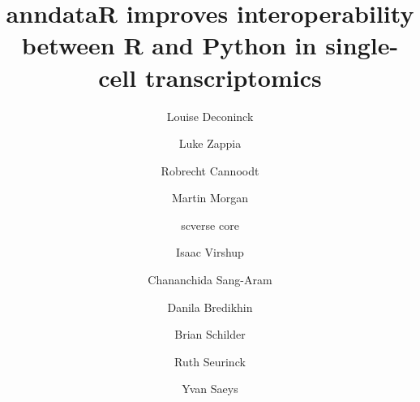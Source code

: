 \documentclass[unnumsec,webpdf,modern,large,namedate]{oup-authoring-template}%
\begin{document}



\title[]{anndataR improves interoperability between R and Python in single-cell transcriptomics}

\author[1,2,\textsuperscript{\textdagger}]{Louise Deconinck}
\author[3,\textsuperscript{\textdagger}]{Luke Zappia}
\author[1,2,3,4\textsuperscript{\textdagger}$\ast$]{Robrecht Cannoodt}
\author[5]{Martin Morgan}
\author[]{scverse core}
\author[6,7]{Isaac Virshup}
\author[1,2]{Chananchida Sang-Aram}
\author[8,9]{Danila Bredikhin}
\author[10]{Brian Schilder}
\author[1,2]{Ruth Seurinck}
\author[1,2]{Yvan Saeys}

\authormark{}

\address[1]{Data Mining and Modelling for Biomedicine, VIB Center for Inflammation Research}
\address[2]{Department of Mathematics, Computer Science and Statistics, Ghent University, Belgium}
\address[3]{Data Intuitive, Lebbeke, Belgium}
\address[4]{Edaro, Destelbergen, Belgium}
\address[5]{Department of Biostatistics and Bioinformatics, Roswell Park Comprehensive Cancer Center}
\address[6]{Institute of Computational Biology, Helmholtz, Center Munich, Munich, Germany}
\address[7]{Chan Zuckerberg Initiative, Redwood City, CA, USA}

\address[8]{Department of Genetics, Stanford University, Stanford, CA, USA}
\address[9]{scverse}
\address[10]{Department of Brain Sciences, Faculty of Medicine, Imperial College London, London, UK}




\end{document}
